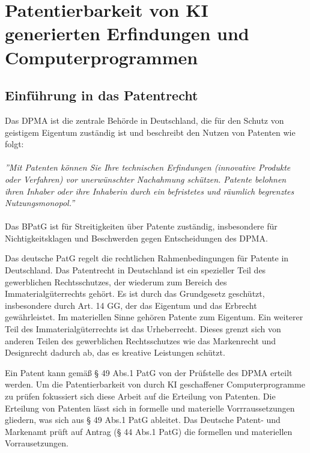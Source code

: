 \chapter{Patentierbarkeit von KI generierten Erfindungen und Computerprogrammen \label{cha:chapter3}}


\section{Einführung in das Patentrecht\label{sec:Patentrecht}}


Das \gls{DPMA} ist die zentrale Behörde in Deutschland, 
die für den Schutz von geistigem Eigentum zuständig ist und 
beschreibt den Nutzen von Patenten wie folgt:
\\
\\
\textit{''Mit Patenten können Sie Ihre technischen Erfindungen 
(innovative Produkte oder Verfahren) vor unerwünschter Nachahmung schützen. 
Patente belohnen ihren Inhaber 
oder ihre Inhaberin durch ein befristetes und räumlich begrenztes Nutzungsmonopol.''} 
\cite{DPMAPatentschutz}
\\
\\
Das \gls{BPatG} ist für Streitigkeiten über Patente zuständig, 
insbesondere für Nichtigkeitsklagen und Beschwerden gegen Entscheidungen des DPMA.

Das deutsche PatG \cite{PatGNichtamtlichesInhaltsverzeichnis} 
regelt die rechtlichen Rahmenbedingungen für Patente in Deutschland.
Das Patentrecht in Deutschland ist ein spezieller Teil des gewerblichen Rechtsschutzes, 
der wiederum zum Bereich des Immaterialgüterrechts gehört. 
Es ist durch das Grundgesetz geschützt, insbesondere durch Art. 14 GG, 
der das Eigentum und das Erbrecht gewährleistet. 
Im materiellen Sinne gehören Patente zum Eigentum.
Ein weiterer Teil des Immaterialgüterrechts ist das Urheberrecht. 
Dieses grenzt sich von anderen Teilen des
gewerblichen Rechtsschutzes wie das Markenrecht und Designrecht dadurch ab, das 
es kreative Leistungen schützt\cite{GewerblicherRechtschutzUnd}. 


Ein Patent kann gemäß § 49 Abs.1 PatG von der Prüfstelle des DPMA erteilt werden. 
Um die Patentierbarkeit von durch KI geschaffener Computerprogramme 
zu prüfen fokussiert sich diese Arbeit auf die Erteilung von Patenten. 
Die Erteilung von Patenten lässt sich in formelle und materielle Vorrraussetzungen 
gliedern, was sich aus § 49 Abs.1 PatG ableitet. 
Das Deutsche Patent- und Markenamt prüft auf Antrag (§ 44 Abs.1 PatG) 
die formellen und materiellen Vorrausetzungen.

